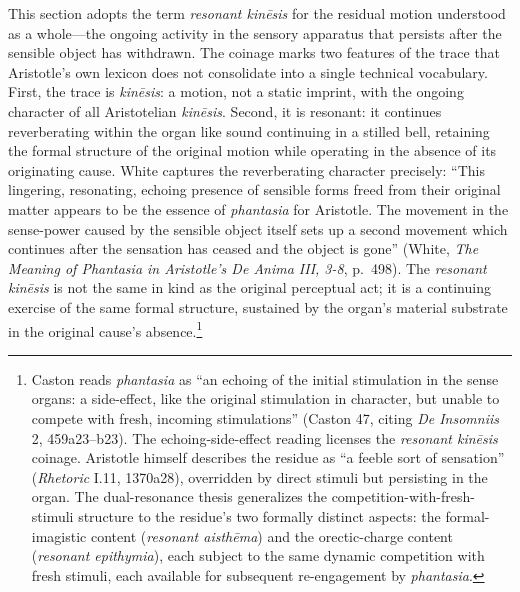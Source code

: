 \documentclass{article}
\begin{document}
This section adopts the term \textit{resonant kinēsis} for the residual motion understood as a whole---the ongoing activity in the sensory apparatus that persists after the sensible object has withdrawn. The coinage marks two features of the trace that Aristotle's own lexicon does not consolidate into a single technical vocabulary. First, the trace is \textit{kinēsis}: a motion, not a static imprint, with the ongoing character of all Aristotelian \textit{kinēsis}. Second, it is resonant: it continues reverberating within the organ like sound continuing in a stilled bell, retaining the formal structure of the original motion while operating in the absence of its originating cause. White captures the reverberating character precisely: ``This lingering, resonating, echoing presence of sensible forms freed from their original matter appears to be the essence of \textit{phantasia} for Aristotle. The movement in the sense-power caused by the sensible object itself sets up a second movement which continues after the sensation has ceased and the object is gone'' (White, \textit{The Meaning of Phantasia in Aristotle's De Anima III, 3-8}, p.~498). The \textit{resonant kinēsis} is not the same in kind as the original perceptual act; it is a continuing exercise of the same formal structure, sustained by the organ's material substrate in the original cause's absence.\footnote{Caston reads \textit{phantasia} as ``an echoing of the initial stimulation in the sense organs: a side-effect, like the original stimulation in character, but unable to compete with fresh, incoming stimulations'' (Caston 47, citing \textit{De Insomniis} 2, 459a23--b23). The echoing-side-effect reading licenses the \textit{resonant kinēsis} coinage. Aristotle himself describes the residue as ``a feeble sort of sensation'' (\textit{Rhetoric} I.11, 1370a28), overridden by direct stimuli but persisting in the organ. The dual-resonance thesis generalizes the competition-with-fresh-stimuli structure to the residue's two formally distinct aspects: the formal-imagistic content (\textit{resonant aisthēma}) and the orectic-charge content (\textit{resonant epithymia}), each subject to the same dynamic competition with fresh stimuli, each available for subsequent re-engagement by \textit{phantasia}.}
\end{document}
